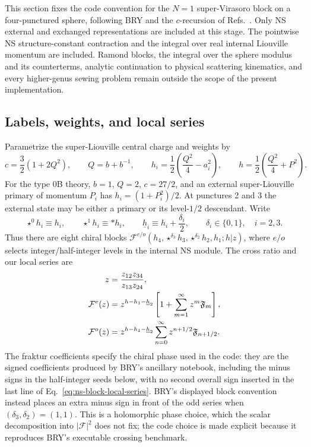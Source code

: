 \documentclass[11pt]{article}
\begin{document}
This section fixes the code convention for the $N=1$ super-Virasoro block on
a four-punctured sphere, following BRY and the $c$-recursion of
Refs.~\cite{HadaszJaskolskiSuchanek2007NSBlocks,Belavin2007FourPoint,
Suchanek2011EllipticRecursion,BalthazarRodriguezYin2023SMatrix}.
Only NS external and exchanged representations are included at this stage.
The pointwise NS structure-constant contraction and the integral over real
internal Liouville momentum are included.  Ramond blocks, the integral over
the sphere modulus and its counterterms, analytic continuation to physical
scattering kinematics, and every higher-genus sewing problem remain outside
the scope of the present implementation.

\subsection{Labels, weights, and local series}

Parametrize the super-Liouville central charge and weights by
\begin{equation}
 c=\frac32(1+2Q^2),\qquad Q=b+b^{-1},\qquad
 h_i=\frac12\left(\frac{Q^2}{4}-a_i^2\right),\qquad
 h=\frac12\left(\frac{Q^2}{4}+P^2\right).
 \label{eq:ns-block-weights}
\end{equation}
For the type 0B theory, $b=1$, $Q=2$, $c=27/2$, and an external
super-Liouville primary of momentum $P_i$ has $h_i=(1+P_i^2)/2$.
At punctures 2 and 3 the external state may be either a primary or its
level-$1/2$ descendant.  Write
\begin{equation}
 \star^0h_i\equiv h_i,\qquad \star^1h_i\equiv *h_i,
 \qquad \underline h_i\equiv h_i+\frac{\delta_i}{2},
 \qquad \delta_i\in\{0,1\},\quad i=2,3.
 \label{eq:ns-block-star-notation}
\end{equation}
Thus there are eight chiral blocks
$\mathcal F^{e/o}(h_4,\star^{\delta_3}h_3,
\star^{\delta_2}h_2,h_1;h|z)$, where $e/o$ selects integer/half-integer
levels in the internal NS module.  The cross ratio and our local series are
\begin{align}
 z&=\frac{z_{12}z_{34}}{z_{13}z_{24}},\notag\\
 \mathcal F^e(z)
 &=z^{h-h_1-\underline h_2}
 \left[1+\sum_{m=1}^{\infty}z^m\mathfrak F_m\right],\notag\\
 \mathcal F^o(z)
 &=z^{h-h_1-\underline h_2}
 \sum_{n=0}^{\infty}z^{n+1/2}\mathfrak F_{n+1/2}.
 \label{eq:ns-block-local-series}
\end{align}
The fraktur coefficients specify the chiral phase used in the code: they are
the signed coefficients produced by BRY's ancillary notebook, including the
minus signs in the half-integer seeds below, with no second overall sign
inserted in the last line of Eq.~\eqref{eq:ns-block-local-series}.  BRY's
displayed block convention instead places an extra minus sign in front of the
odd series when $(\delta_3,\delta_2)=(1,1)$.  This is a holomorphic phase
choice, which the scalar decomposition into $|\mathcal F|^2$ does not fix;
the code choice is made explicit because it reproduces BRY's executable
crossing benchmark.
\end{document}
